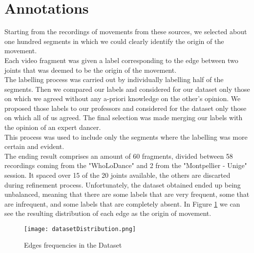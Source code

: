 \section{Annotations}
\label{sec:annotations}
Starting from the recordings of movements from these sources, we selected about one hundred segments in which we could clearly identify the origin of the movement.\\
Each video fragment was given a label corresponding to the edge between two joints that was deemed to be the origin of the movement.\\
The labelling process was carried out by individually labelling half of the segments. Then we compared our labels and considered for our dataset only those on which we agreed without any a-priori knowledge on the other's opinion.
We proposed those labels to our professors and considered for the dataset only those on which all of us agreed.
The final selection was made merging our labels with the opinion of an expert dancer.\\
This process was used to include only the segments where the labelling was more certain and evident.\\ 

The ending result comprises an amount of 60 fragments, divided between 58 recordings coming from the "WhoLoDance" and 2 from the "Montpellier - Unige" session. 
It spaced over 15 of the 20 joints available, the others are discarted during refinement process.
Unfortunately, the dataset obtained ended up being unbalanced, meaning that there are some labels that are very frequent, some that are infrequent, and some labels that are completely absent.
In Figure \ref{fig:dataset_distribution} we can see the resulting distribution of each edge as the origin of movement.

\begin{figure}[H]
    \centering
    \texttt{[image: datasetDistribution.png]}
    \caption{Edges frequencies in the Dataset}
    \label{fig:dataset_distribution}
\end{figure}